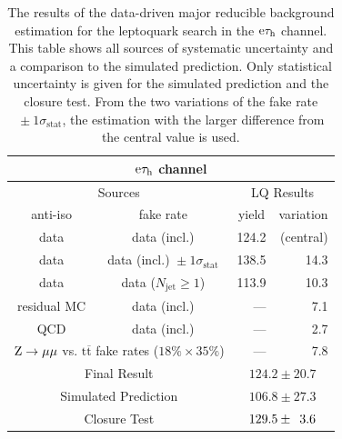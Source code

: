 \documentclass[12pt]{thesis}  %
\newcommand{\tauh}{\ensuremath{\tau_{\text{h}}}\xspace}
\newcommand{\Pe}{\ensuremath{\cmsSymbolFace{e}}\xspace}
\newcommand{\etau}{\ensuremath{\Pe\tauh}\xspace}
\renewcommand{\ttbar}{\ensuremath{\mathrm{t}\overline{\mathrm{t}}}\xspace}
\newcommand{\ra}{\ensuremath{\rightarrow}}%
\newcommand{\Zmm}{\ensuremath{\Z \ra \mu\mu}\xspace}%
\begin{document}
\begin{table}[hbt]
  \begin{center}
    \begin{tabular}{|c|c|r|r|}
      \multicolumn{4}{c}{\etau channel} \\
      \hline
      \multicolumn{2}{|c|}{Sources} & \multicolumn{2}{|c|}{LQ Results} \\
      \hline
      anti-iso    & fake rate                                             & \multicolumn{1}{c|}{yield}  & \multicolumn{1}{c|}{variation} \\
      \hline
      data        & data (incl.)                                          & 124.2 & (central)   \\
      data        & data (incl.) ${}\pm 1\sigma_{\text{stat}}$            & 138.5 & 14.3 \\
      data        & data ($N_{\text{jet}} \geq 1$)                        & 113.9 & 10.3         \\ 
      residual MC & data (incl.)                                          & ---   & 7.1              \\
      QCD         & data (incl.)                                          & ---   & 2.7  \\
      \multicolumn{2}{|c|}{\Zmm vs. \ttbar fake rates ($18\%\times35\%$)} & --- & 7.8 \\
      \hline
      \multicolumn{2}{|c|}{Final Result}         & \multicolumn{2}{c|}{$124.2 \pm 20.7$} \\
      \multicolumn{2}{|c|}{Simulated Prediction} & \multicolumn{2}{c|}{$106.8 \pm 27.3$} \\
      \multicolumn{2}{|c|}{Closure Test}         & \multicolumn{2}{c|}{$129.5 \pm \hphantom{1}3.6$} \\
      \hline
    \end{tabular}
    \caption{The results of the data-driven major reducible background estimation for the leptoquark search in the \etau channel. This table shows all sources of systematic uncertainty and a comparison to the simulated prediction. Only statistical uncertainty is given for the simulated prediction and the closure test. From the two variations of the fake rate ${}\pm 1\sigma_{\text{stat}}$, the estimation with the larger difference from the central value is used.}
    \label{Bkg:tab:faketauresultsetauLQ}
  \end{center}
\end{table}
\end{document}
